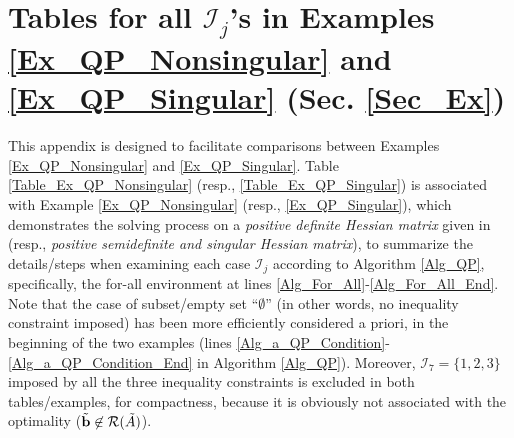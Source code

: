 \documentclass[9pt,twocolumn,twoside,lineno]{pnas-new-1}
\newcommand{\bfb}{{\bf b}}
\newcommand{\calI}{{\mathcal I}}
\newcommand{\calR}{{\mathcal R}}
\theoremstyle{remark}
\begin{document}
\section{Tables for all $\calI_j$'s in Examples \ref{Ex_QP_Nonsingular} and \ref{Ex_QP_Singular} (Sec. \ref{Sec_Ex})}
\label{App_Tables}

This appendix is designed to facilitate comparisons between Examples \ref{Ex_QP_Nonsingular} and \ref{Ex_QP_Singular}. Table \ref{Table_Ex_QP_Nonsingular} (resp., \ref{Table_Ex_QP_Singular}) is associated with Example \ref{Ex_QP_Nonsingular} (resp., \ref{Ex_QP_Singular}), which demonstrates the solving process on a \textit{positive definite Hessian matrix} given in \cite{Lu(Ye):03(16)} (resp., \textit{positive semidefinite and singular Hessian matrix}), to summarize the details/steps when examining each case $\calI_j$ according to Algorithm \ref{Alg_QP}, specifically, the for-all environment at lines \ref{Alg_For_All}-\ref{Alg_For_All_End}. Note that the case of subset/empty set ``$\emptyset$'' (in other words, no inequality constraint imposed) has been more efficiently considered a priori, in the beginning of the two examples (lines \ref{Alg_a_QP_Condition}-\ref{Alg_a_QP_Condition_End} in Algorithm \ref{Alg_QP}). Moreover, $\calI_7=\{1,2,3\}$ imposed by all the three inequality constraints is excluded in both tables/examples, for compactness, because it is obviously not associated with the optimality ($\tilde\bfb\not\in\calR(\tilde A)$).
\end{document}
